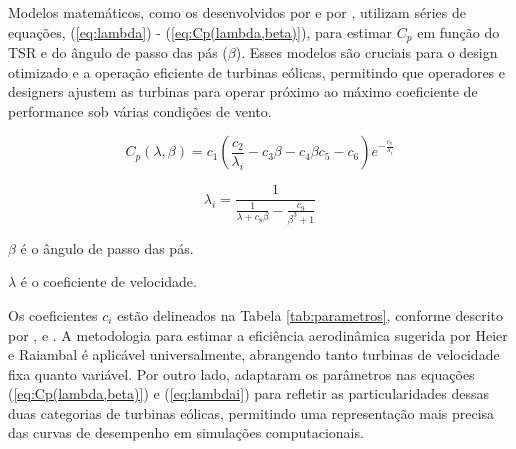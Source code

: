     \par Modelos matemáticos, como os desenvolvidos por  e por , utilizam séries de equações, (\ref{eq:lambda}) - (\ref{eq:Cp(lambda,beta)}), para estimar $C_p$ em função do TSR e do ângulo de passo das pás ($\beta$). Esses modelos são cruciais para o design otimizado e a operação eficiente de turbinas eólicas, permitindo que operadores e designers ajustem as turbinas para operar próximo ao máximo coeficiente de performance sob várias condições de vento.

    \begin{equation}
        C_p(\lambda, \beta) = c_1 \left( \frac{c_2}{\lambda_i} - c_3 \beta - c_4 \beta c_5 - c_6 \right) e^{-\frac{c_7}{\lambda_i}} 
        \label{eq:Cp(lambda,beta)}
    \end{equation}
        
    \begin{equation}
        \lambda_i = \frac{1}{\frac{1}{\lambda + c_8 \beta} -\frac{c_9}{\beta^3 + 1}}
        \label{eq:lambdai}
    \end{equation}

    \par $\beta$ é  o ângulo de passo das pás.
    \par $\lambda$ é o coeficiente de velocidade.

    \par Os coeficientes $c_i$ estão delineados na Tabela \ref{tab:parametros}, conforme descrito por ,  e . A metodologia para estimar a eficiência aerodinâmica sugerida por Heier e Raiambal é aplicável universalmente, abrangendo tanto turbinas de velocidade fixa quanto variável. Por outro lado,  adaptaram os parâmetros nas equações (\ref{eq:Cp(lambda,beta)}) e (\ref{eq:lambdai}) para refletir as particularidades dessas duas categorias de turbinas eólicas, permitindo uma representação mais precisa das curvas de desempenho em simulações computacionais.

